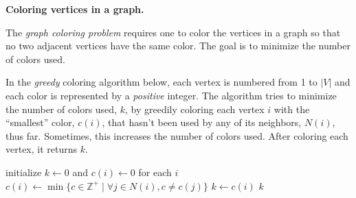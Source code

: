 \documentclass[11pt,addpoints]{exam}
\begin{document}
\begin{questions}
  \question \textbf{Coloring vertices in a graph.}
  
  The \emph{graph coloring problem} requires one to color the vertices in a graph so that no two adjacent vertices have the same color. The goal is to minimize the number of colors used. 
  
  In the \emph{greedy} coloring algorithm below, each vertex is numbered from 1 to $|V|$ and each color is represented by a \emph{positive} integer. The algorithm tries to minimize the number of colors used, $k$, by greedily coloring each vertex $i$ with the ``smallest''  color, $c(i)$, that hasn't been used by any of its neighbors,  $N(i)$, thus far. Sometimes, this increases the number of colors used. After coloring each vertex, it returns $k$.
  
  \begin{minipage}{1.0\linewidth}
        \begin{algorithm}[H]
          \begin{algorithmic}[1]
            \State initialize $k \gets 0$ and $c(i) \gets 0$ for each $i$
                \State $c(i) \gets \min \{ c \in \mathbb{Z}^+ \mid \forall j \in N(i), c \neq c(j) \}$
                    \State $k \gets c(i)$
                \EndIf
            \EndFor
          \State \Return $k$
          \EndFunction
          \end{algorithmic}
        \end{algorithm}
    \end{minipage}
  
\end{questions}
\end{document}
